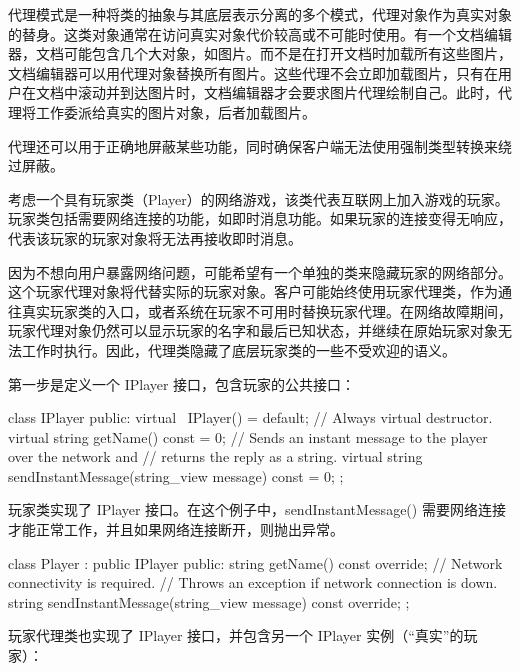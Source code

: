 
代理模式是一种将类的抽象与其底层表示分离的多个模式，代理对象作为真实对象的替身。这类对象通常在访问真实对象代价较高或不可能时使用。有一个文档编辑器，文档可能包含几个大对象，如图片。而不是在打开文档时加载所有这些图片，文档编辑器可以用代理对象替换所有图片。这些代理不会立即加载图片，只有在用户在文档中滚动并到达图片时，文档编辑器才会要求图片代理绘制自己。此时，代理将工作委派给真实的图片对象，后者加载图片。

代理还可以用于正确地屏蔽某些功能，同时确保客户端无法使用强制类型转换来绕过屏蔽。


考虑一个具有玩家类（Player）的网络游戏，该类代表互联网上加入游戏的玩家。玩家类包括需要网络连接的功能，如即时消息功能。如果玩家的连接变得无响应，代表该玩家的玩家对象将无法再接收即时消息。

因为不想向用户暴露网络问题，可能希望有一个单独的类来隐藏玩家的网络部分。这个玩家代理对象将代替实际的玩家对象。客户可能始终使用玩家代理类，作为通往真实玩家类的入口，或者系统在玩家不可用时替换玩家代理。在网络故障期间，玩家代理对象仍然可以显示玩家的名字和最后已知状态，并继续在原始玩家对象无法工作时执行。因此，代理类隐藏了底层玩家类的一些不受欢迎的语义。


第一步是定义一个 IPlayer 接口，包含玩家的公共接口：

\begin{cpp}
class IPlayer
{
    public:
        virtual ~IPlayer() = default; // Always virtual destructor.
        virtual string getName() const = 0;
        // Sends an instant message to the player over the network and
        // returns the reply as a string.
        virtual string sendInstantMessage(string_view message) const = 0;
};
\end{cpp}

玩家类实现了 IPlayer 接口。在这个例子中，sendInstantMessage() 需要网络连接才能正常工作，并且如果网络连接断开，则抛出异常。

\begin{cpp}
class Player : public IPlayer
{
    public:
        string getName() const override;
        // Network connectivity is required.
        // Throws an exception if network connection is down.
        string sendInstantMessage(string_view message) const override;
};
\end{cpp}

玩家代理类也实现了 IPlayer 接口，并包含另一个 IPlayer 实例（“真实”的玩家）：

